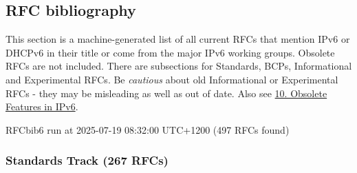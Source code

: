 \documentclass[
]{article}
\begin{document}
\pagebreak

\subsection{RFC bibliography}\label{rfc-bibliography}

This section is a machine-generated list of all current RFCs that
mention IPv6 or DHCPv6 in their title or come from the major IPv6
working groups. Obsolete RFCs are not included. There are subsections
for Standards, BCPs, Informational and Experimental RFCs. Be
\emph{cautious} about old Informational or Experimental RFCs - they may
be misleading as well as out of date. Also see
\hyperref[obsolete-features-in-ipv6]{10. Obsolete Features in IPv6}.

RFCbib6 run at 2025-07-19 08:32:00 UTC+1200 (497 RFCs found)

\subsubsection{Standards Track (267
RFCs)}\label{standards-track-267-rfcs}
\end{document}
